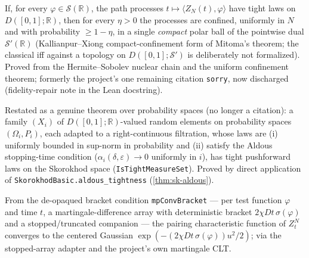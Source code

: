 \begin{theorem}\label{thm:ew-mitoma}
  \leanok
  If, for every $\varphi\in\mathcal S(\mathbb R)$, the path processes
  $t\mapsto\langle Z_N(t),\varphi\rangle$ have tight laws on $D([0,1];\mathbb R)$,
  then for every $\eta>0$ the processes are confined, uniformly in $N$ and with
  probability $\ge 1-\eta$, in a single \emph{compact} polar ball of the pointwise
  dual $\mathcal S'(\mathbb R)$ (Kallianpur--Xiong compact-confinement form of
  Mitoma's theorem; the classical iff against a topology on
  $D([0,1];\mathcal S')$ is deliberately not formalized). Proved from the
  Hermite--Sobolev nuclear chain and the uniform confinement theorem; formerly
  the project's one remaining citation \texttt{sorry}, now discharged
  (fidelity-repair note in the Lean docstring).\end{theorem}

\begin{proposition}\label{prop:ew-aldous}
  \leanok
  Restated as a genuine theorem over probability spaces (no longer a citation): a
  family $(X_i)$ of $D([0,1];\mathbb R)$-valued random elements on probability spaces
  $(\Omega_i, P_i)$, each adapted to a right-continuous filtration, whose laws are
  (i) uniformly bounded in sup-norm in probability and (ii) satisfy the Aldous
  stopping-time condition ($\alpha_i(\delta,\varepsilon) \to 0$ uniformly in $i$),
  has tight pushforward laws on the Skorokhod space
  (\texttt{IsTightMeasureSet}).  Proved by direct application of
  \texttt{SkorokhodBasic.aldous\_tightness} (\ref{thm:sk-aldous}).
\end{proposition}

\begin{lemma}\label{lem:ew-gaussfdd}
  \leanok
  From the de-opaqued bracket condition \texttt{mpConvBracket} --- per test function
  $\varphi$ and time $t$, a martingale-difference array with deterministic bracket
  $2\chi Dt\,\sigma(\varphi)$ and a stopped/truncated companion --- the pairing
  characteristic function of $Z_t^N$ converges to the centered Gaussian
  $\exp(-(2\chi Dt\,\sigma(\varphi))u^2/2)$; via the stopped-array adapter and the
  project's own martingale CLT.
\end{lemma}

